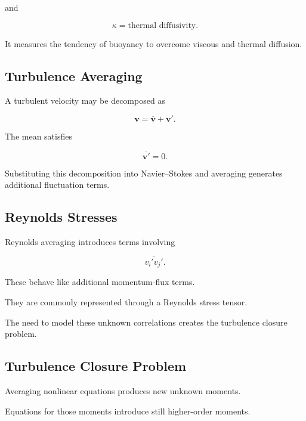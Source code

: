 and

\[
\kappa
=
\text{thermal diffusivity}.
\]

It measures the tendency of buoyancy to overcome viscous and thermal
diffusion.

\subsection{Turbulence Averaging}
\label{subsec:turbulence-averaging}

A turbulent velocity may be decomposed as

\[
\boxed{
\mathbf{v}
=
\overline{\mathbf{v}}
+
\mathbf{v}'.
}
\]

The mean satisfies

\[
\boxed{
\overline{\mathbf{v}'}
=
0.
}
\]

Substituting this decomposition into Navier--Stokes and averaging generates
additional fluctuation terms.

\subsection{Reynolds Stresses}
\label{subsec:reynolds-stresses}

Reynolds averaging introduces terms involving

\[
\boxed{
\overline{v_i'v_j'}.
}
\]

These behave like additional momentum-flux terms.

They are commonly represented through a Reynolds stress tensor.

The need to model these unknown correlations creates the turbulence closure
problem.

\subsection{Turbulence Closure Problem}
\label{subsec:turbulence-closure}

Averaging nonlinear equations produces new unknown moments.

Equations for those moments introduce still higher-order moments.

